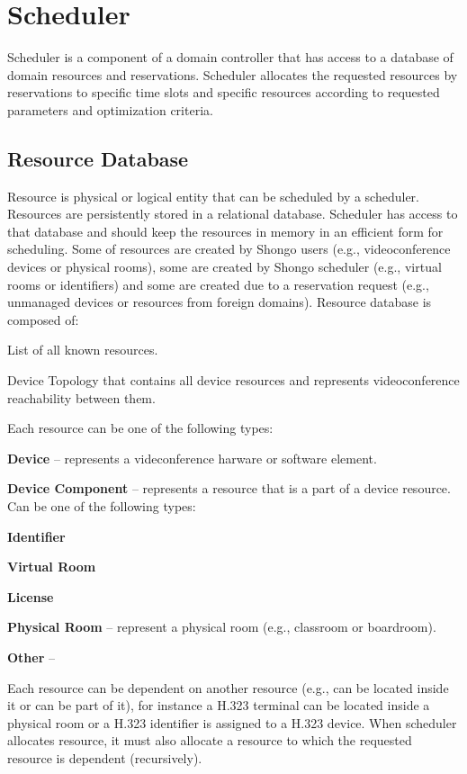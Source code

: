 \chapter{Scheduler}

\newcommand{\SchedulerInputCode}[1]{
\UseCodeStyle{
  Object, Enum, Integer, String, Boolean, List, Set,  
  IP-Address, URL, URN, 
  extends, of, or, *
}
\vspace{2mm}

}

Scheduler is a component of a domain controller that has access to a database 
of domain resources and reservations. Scheduler allocates the requested 
resources by reservations to specific time slots and specific resources 
according to requested parameters and optimization criteria.

\section{Resource Database}

Resource is physical or logical entity that can be scheduled by a scheduler. 
Resources are persistently stored in a relational database. Scheduler has 
access to that database and should keep the resources in memory in an 
efficient form for scheduling. Some of resources are created by Shongo users 
(e.g., videoconference devices or physical rooms), some are created by Shongo 
scheduler (e.g., virtual rooms or identifiers) and some are created due to a 
reservation request (e.g., unmanaged devices or resources from foreign 
domains). Resource database is composed of:
\begin{compactenum}
\item List of all known resources.
\item Device Topology that contains all device resources and represents 
videoconference reachability between them.
\end{compactenum}
Each resource can be one of the following types:
\begin{compactenum}
\item \textbf{Device} -- represents a videconference harware or software 
  element.
\item \textbf{Device Component} -- represents a resource that is a part of a 
  device resource. Can be one of the following types:
  \begin{compactenum}
    \item \textbf{Identifier}
    \item \textbf{Virtual Room}
    \item \textbf{License}
  \end{compactenum}
\item \textbf{Physical Room} -- represent a physical room (e.g., classroom or 
  boardroom).
\item \textbf{Other} -- 
\end{compactenum}
Each resource can be dependent on another resource (e.g., can be located 
inside it or can be part of it), for instance a H.323 terminal can be located 
inside a physical room or a H.323 identifier is assigned to a H.323 device. 
When scheduler allocates resource, it must also allocate a resource to which 
the requested resource is dependent (recursively).

